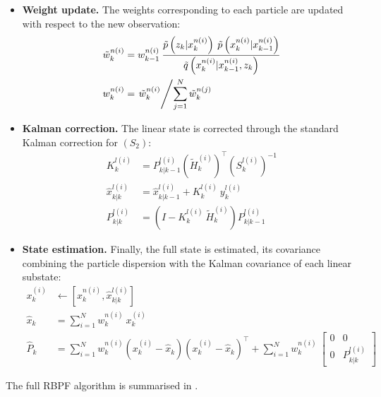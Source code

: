 \begin{itemize}
	\item\textbf{Weight update.} The weights corresponding to each particle are updated with respect to the new observation:
	\begin{align}
		\tilde{w}_k^{n(i)}&=w_{k-1}^{n(i)}\:\dfrac{\tilde{p}\left(z_k|x_k^{n(i)}\right)\:\tilde{p}\left(x_k^{n(i)}|x_{k-1}^{n(i)}\right)}{\tilde{q}\left(x_k^{n(i)}|x_{k-1}^{n(i)},z_k\right)}\label{eq:RBPF_update_debut}\\
		w_k^{n(i)}&=\left.\tilde{w}_k^{n(i)}\middle/\sum_{j=1}^N\tilde{w}_k^{n(j)}\right.\label{eq:RBPF_update_fin}
	\end{align}
	\item\textbf{Kalman correction.} The linear state is corrected through the standard Kalman correction for $(S_2)$:
	\begin{align}
		K_k^{l(i)}&=P_{k|k-1}^{l(i)}\left(\tilde{H}_k^{(i)}\right)^\top\left(S_k^{l(i)}\right)^{-1}\label{eq:RBPF_correction_debut}\\
		\hat{x}_{k|k}^{l(i)}&=\hat{x}_{k|k-1}^{l(i)}+K_k^{l(i)}\:y_k^{l(i)}\\
		P_{k|k}^{l(i)}&=\left(I-K_k^{l(i)}\:\tilde{H}_k^{(i)}\right)P_{k|k-1}^{l(i)}\label{eq:RBPF_correction_fin}
	\end{align}
	\item\textbf{State estimation.} Finally, the full state is estimated, its covariance combining the particle dispersion with the Kalman covariance of each linear substate:
	\begin{align}
		x_k^{(i)}&\gets\left[x_k^{n(i)},\hat{x}_{k|k}^{l(i)}\right]\label{eq:RBPF_estimation_debut}\\
		\hat{x}_k&=\sum_{i=1}^Nw_k^{n(i)}\:x_k^{(i)}\\
		\hat{P}_k&=\sum_{i=1}^Nw_k^{n(i)}\left(x_k^{(i)}-\hat{x}_k\right)\left(x_k^{(i)}-\hat{x}_k\right)^\top+\sum_{i=1}^Nw_k^{n(i)}\:\begin{bmatrix}0&0\\0&P_{k|k}^{l(i)}\end{bmatrix}\label{eq:RBPF_estimation_fin}
	\end{align}
\end{itemize}

The full RBPF algorithm is summarised in .

